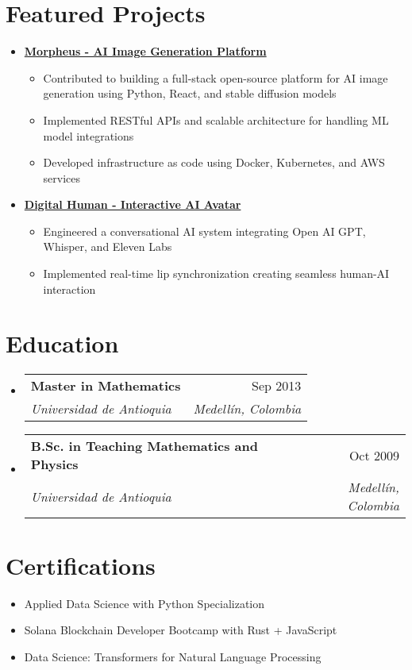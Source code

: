 \documentclass[letterpaper,11pt]{article}
\makeatletter
\newcommand{\resumeSubheading}[4]{
  \vspace{-2pt}
  \item[]
  \begin{tabular*}{\textwidth}{@{\extracolsep{\fill}}l r}
    \textbf{#1} & #2 \\
    \textit{#3} & \textit{#4} \\
  \end{tabular*}
  \vspace{-5pt}
}
\makeatother
\begin{document}
\section{Featured Projects}
\begin{itemize}[leftmargin=*]
    \item \textbf{\href{https://github.com/Monadical-SAS/Morpheus}{Morpheus - AI Image Generation Platform \faExternalLink}}
    \begin{itemize}
        \item Contributed to building a full-stack open-source platform for AI image generation using Python, React, and stable diffusion models
        \item Implemented RESTful APIs and scalable architecture for handling ML model integrations
        \item Developed infrastructure as code using Docker, Kubernetes, and AWS services
    \end{itemize}
    
    \item \textbf{\href{https://github.com/asanchezyali/talking-avatar-with-ai}{Digital Human - Interactive AI Avatar \faExternalLink}}
    \begin{itemize}
        \item Engineered a conversational AI system integrating Open AI GPT, Whisper, and Eleven Labs
        \item Implemented real-time lip synchronization creating seamless human-AI interaction
    \end{itemize}
\end{itemize}

\section{Education}
\begin{itemize}[leftmargin=0pt, itemindent=0pt, label={}]
\resumeSubheading
{Master in Mathematics}{Sep 2013}
{Universidad de Antioquia}{Medellín, Colombia}

\resumeSubheading
{B.Sc. in Teaching Mathematics and Physics}{Oct 2009}
{Universidad de Antioquia}{Medellín, Colombia}
\end{itemize}

\section{Certifications}
\begin{itemize}[leftmargin=*]
    \item Applied Data Science with Python Specialization
    \item Solana Blockchain Developer Bootcamp with Rust + JavaScript
    \item Data Science: Transformers for Natural Language Processing
\end{itemize}
\end{document}
